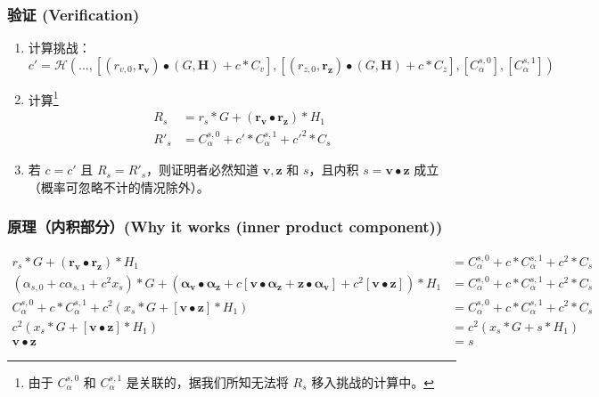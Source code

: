 \subsubsection*{验证 (Verification)}

\begin{enumerate}
	\item 计算挑战：
	\[c' = \mathcal{H}(...,[(r_{v,0},\boldsymbol{r_v}) \bullet (G,\textbf{H}) + c*C_v],[(r_{z,0},\boldsymbol{r_z}) \bullet (G,\textbf{H}) + c*C_z],[C^{s,0}_{\alpha}],[C^{s,1}_{\alpha}])\]
	\item 计算\footnote{由于 $C^{s,0}_{\alpha}$ 和 $C^{s,1}_{\alpha}$ 是关联的，据我们所知无法将 $R_s$ 移入挑战的计算中。}
	\begin{align*}
	R_s &= r_s*G + (\boldsymbol{r_v} \bullet \boldsymbol{r_z})*H_1 \\
	R'_s &= C_{\alpha}^{s,0} + c'*C_{\alpha}^{s,1} + c'^2*C_s
	\end{align*}
	\item 若 $c = c'$ 且 $R_s = R'_s$，则证明者必然知道 $\boldsymbol{v}, \boldsymbol{z}$ 和 $s$，且内积 $s = \boldsymbol{v} \bullet \boldsymbol{z}$ 成立（概率可忽略不计的情况除外）。
\end{enumerate}

\subsubsection*{原理（内积部分）(Why it works (inner product component))}

\begin{align*}
r_s*G + (\boldsymbol{r_v} \bullet \boldsymbol{r_z})*H_1 &= C_{\alpha}^{s,0} + c*C_{\alpha}^{s,1} + c^2*C_s \\
(\alpha_{s,0} + c \alpha_{s,1} + c^2 x_s)*G + (\boldsymbol{\alpha_v} \bullet \boldsymbol{\alpha_z} + c[\boldsymbol{v} \bullet \boldsymbol{\alpha_z} + \boldsymbol{z} \bullet \boldsymbol{\alpha_v}] + c^2 [\boldsymbol{v} \bullet \boldsymbol{z}])*H_1 &= C_{\alpha}^{s,0} + c*C_{\alpha}^{s,1} + c^2*C_s \\
C_{\alpha}^{s,0} + c*C_{\alpha}^{s,1} + c^2 (x_s*G + [\boldsymbol{v} \bullet \boldsymbol{z}]*H_1) &= C_{\alpha}^{s,0} + c*C_{\alpha}^{s,1} + c^2*C_s \\
c^2 (x_s*G + [\boldsymbol{v} \bullet \boldsymbol{z}]*H_1) &= c^2(x_s*G + s*H_1) \\
\boldsymbol{v} \bullet \boldsymbol{z} &= s
\end{align*}

